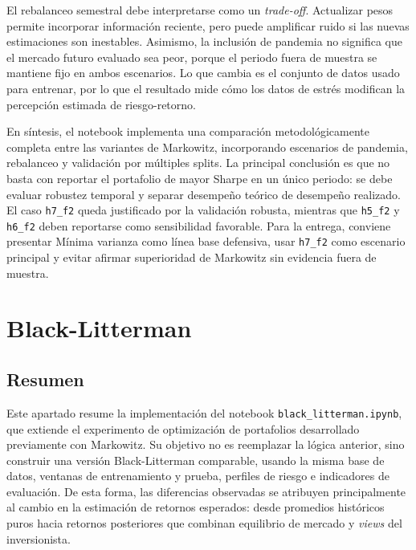 El rebalanceo semestral debe interpretarse como un \textit{trade-off}.
Actualizar pesos permite incorporar informaci\'on reciente, pero puede amplificar
ruido si las nuevas estimaciones son inestables. Asimismo, la inclusi\'on de
pandemia no significa que el mercado futuro evaluado sea peor, porque el periodo
fuera de muestra se mantiene fijo en ambos escenarios. Lo que cambia es el
conjunto de datos usado para entrenar, por lo que el resultado mide c\'omo los
datos de estr\'es modifican la percepci\'on estimada de riesgo-retorno.

En s\'intesis, el notebook implementa una comparaci\'on metodol\'ogicamente
completa entre las variantes de Markowitz, incorporando escenarios de pandemia,
rebalanceo y validaci\'on por m\'ultiples splits. La principal conclusi\'on es que
no basta con reportar el portafolio de mayor Sharpe en un \'unico periodo: se
debe evaluar robustez temporal y separar desempe\~no te\'orico de desempe\~no
realizado. El caso \texttt{h7\_f2} queda justificado por la validaci\'on robusta,
mientras que \texttt{h5\_f2} y \texttt{h6\_f2} deben reportarse como sensibilidad
favorable. Para la entrega, conviene presentar M\'inima varianza como l\'inea
base defensiva, usar \texttt{h7\_f2} como escenario principal y evitar afirmar
superioridad de Markowitz sin evidencia fuera de muestra.

\clearpage

\section*{Black-Litterman}

\subsection*{Resumen}

Este apartado resume la implementaci\'on del notebook
\texttt{black\_litterman.ipynb}, que extiende el experimento de optimizaci\'on de
portafolios desarrollado previamente con Markowitz. Su objetivo no es reemplazar
la l\'ogica anterior, sino construir una versi\'on Black-Litterman comparable,
usando la misma base de datos, ventanas de entrenamiento y prueba, perfiles de
riesgo e indicadores de evaluaci\'on. De esta forma, las diferencias observadas
se atribuyen principalmente al cambio en la estimaci\'on de retornos esperados:
desde promedios hist\'oricos puros hacia retornos posteriores que combinan
equilibrio de mercado y \textit{views} del inversionista.


